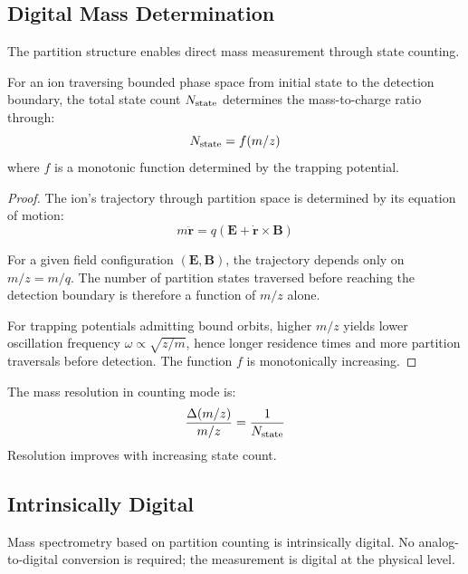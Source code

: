 \subsection{Digital Mass Determination}

The partition structure enables direct mass measurement through state counting.

\begin{theorem}
\label{thm:statemass}
For an ion traversing bounded phase space from initial state to the detection boundary, the total state count $N_{\mathrm{state}}$ determines the mass-to-charge ratio through:
\begin{equation}
    N_{\mathrm{state}} = f(m/z)
\end{equation}
where $f$ is a monotonic function determined by the trapping potential.
\end{theorem}

\begin{proof}
The ion's trajectory through partition space is determined by its equation of motion:
\begin{equation}
    m\ddot{\mathbf{r}} = q(\mathbf{E} + \dot{\mathbf{r}} \times \mathbf{B})
\end{equation}

For a given field configuration $(\mathbf{E}, \mathbf{B})$, the trajectory depends only on $m/z = m/q$. The number of partition states traversed before reaching the detection boundary is therefore a function of $m/z$ alone.

For trapping potentials admitting bound orbits, higher $m/z$ yields lower oscillation frequency $\omega \propto \sqrt{z/m}$, hence longer residence times and more partition traversals before detection. The function $f$ is monotonically increasing.
\end{proof}

\begin{definition}
\label{def:resolution}
The mass resolution in counting mode is:
\begin{equation}
    \frac{\Delta(m/z)}{m/z} = \frac{1}{N_{\mathrm{state}}}
\end{equation}
Resolution improves with increasing state count.
\end{definition}

\subsection{Intrinsically Digital}

\begin{proposition}
Mass spectrometry based on partition counting is intrinsically digital. No analog-to-digital conversion is required; the measurement is digital at the physical level.
\end{proposition}

